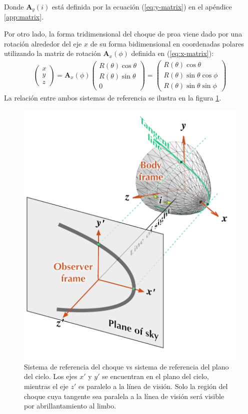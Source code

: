 Donde $\mathbf{A}_y(i)$ está definida por la ecuación (\ref{eq:y-matrix}) en el apéndice \ref{app:matrix}.

Por otro lado, la forma tridimensional del choque de proa viene dado por una rotación alrededor del eje $x$ de su forma bidimensional en coordenadas polares utilizando la matriz de rotación $\mathbf{A}_x(\phi)$ definida en (\ref{eq:x-matrix}):
\begin{align}
  \left(
  \begin{array}{c}
    x \\ y \\ z
  \end{array}
  \right) = \mathbf{A}_x(\phi)\left(
  \begin{array}{c}
    R(\theta)\cos\theta \\ R(\theta)\sin\theta \\ 0
  \end{array}
  \right)
  = \left(
    \begin{array}{c}
      R(\theta)\cos\theta \\
      R(\theta)\sin\theta\cos\phi \\
      R(\theta)\sin\theta\sin\phi
    \end{array}
    \right)
\end{align}
La relación entre ambos sistemas de referencia se ilustra en la figura \ref{fig:reference}.
\begin{figure}
  \includegraphics[width=0.5\linewidth]{./Figures/projection-pos}
  \caption{Sistema de referencia del choque vs sistema de referencia del plano del cielo. Los ejes $x'$ y $y'$ se encuentran en el plano del cielo, mientras el eje $z'$ es paralelo a la línea de visión. Solo la región del choque cuya tangente sea paralela a la línea de visión será visible por abrillantamiento al limbo.}
  \label{fig:reference}
\end{figure}

